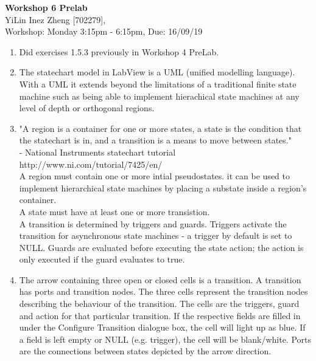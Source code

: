 \documentclass[11pt]{article}
\begin{document}
\begin{center}
\textbf{\Large{Workshop 6 Prelab}}\\
YiLin Inez Zheng [702279], \\
Workshop: Monday 3:15pm - 6:15pm, Due: 16/09/19  
\end{center}

\begin{enumerate}
    \item %
    Did exercises 1.5.3 previously in Workshop 4 PreLab. 
    \item %
    The statechart model in LabView is a UML (unified modelling language). With a UML it extends beyond the limitations of a traditional finite state machine such as being able to implement hierachical state machines at any level of depth or orthogonal regions. 
    \item %
     "A region is a container for one or more states, a state is the condition that the statechart is in, and a transition is a means to move between states." \\
     - National Instruments statechart tutorial http://www.ni.com/tutorial/7425/en/\\
     A region must contain one or more intial pseudostates. it can be used to implement hierarchical state machines by placing a substate inside a region's container.\\
     A state must have at least one or more transistion.\\
     A transition is determined by triggers and guards. Triggers activate the transition for asynchronous state machines - a trigger by default is set to NULL. Guards are evaluated before executing the state action; the action is only executed if the guard evaluates to true. 
    \item %
    The arrow containing three open or closed cells is a transition. A transition has ports and transition nodes. The three cells represent the transition nodes describing the behaviour of the transition. The cells are the triggers, guard and action for that particular transition. If the respective fields are filled in under the Configure Transition dialogue box, the cell will light up as blue. If a field is left empty or NULL (e.g. trigger), the cell will be blank/white. Ports are the connections between states depicted by the arrow direction.
\end{enumerate}
\end{document}

